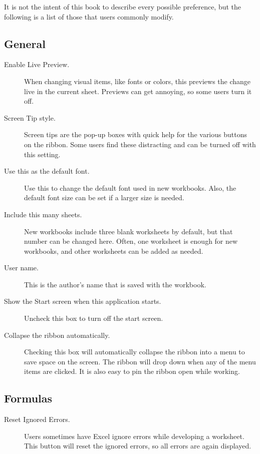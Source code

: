 It is not the intent of this book to describe every possible preference, but the following is a list of those that users commonly modify.

\subsection{General}

\begin{description}
	\item[Enable Live Preview.] When changing visual items, like fonts or colors, this previews the change live in the current sheet. Previews can get annoying, so some users turn it off.
	\item[Screen Tip style.] Screen tips are the pop-up boxes with quick help for the various buttons on the ribbon. Some users find these distracting and can be turned off with this setting.
	\item[Use this as the default font.] Use this to change the default font used in new workbooks. Also, the default font size can be set if a larger size is needed.
	\item[Include this many sheets.] New workbooks include three blank worksheets by default, but that number can be changed here. Often, one worksheet is enough for new workbooks, and other worksheets can be added as needed.
	\item[User name.] This is the author's name that is saved with the workbook.
	\item[Show the Start screen when this application starts.] Uncheck this box to turn off the start screen.
	\item[Collapse the ribbon automatically.] Checking this box will automatically collapse the ribbon into a menu to save space on the screen. The ribbon will drop down when any of the menu items are clicked. It is also easy to pin the ribbon open while working.
\end{description}

\subsection{Formulas}

\begin{description}
	\item[Reset Ignored Errors.] Users sometimes have Excel ignore errors while developing a worksheet. This button will reset the ignored errors, so all errors are again displayed.
\end{description}

